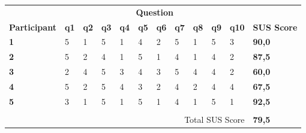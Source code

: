 \begin{table}[]
    \centering
    \begin{tabular}{llllllllllll}
    \rowcolor[HTML]{FFFFFF} 
                         & \multicolumn{10}{c}{\cellcolor[HTML]{FFFFFF}\textbf{Question}}                                                                             & \textbf{}          \\
    \rowcolor[HTML]{FFFFFF} 
    \textbf{Participant} & \textbf{q1} & \textbf{q2} & \textbf{q3} & \textbf{q4} & \textbf{q5} & \textbf{q6} & \textbf{q7} & \textbf{q8} & \textbf{q9} & \textbf{q10} & \textbf{SUS Score} \\
    \rowcolor[HTML]{FFFFFF} 
    \textbf{1}           & 5           & 1           & 5           & 1           & 4           & 2           & 5           & 1           & 5           & 3            & \textbf{90,0}      \\
    \rowcolor[HTML]{FFFFFF} 
    \textbf{2}           & 5           & 2           & 4           & 1           & 5           & 1           & 4           & 1           & 4           & 2            & \textbf{87,5}      \\
    \rowcolor[HTML]{FFFFFF} 
    \textbf{3}           & 2           & 4           & 5           & 3           & 4           & 3           & 5           & 4           & 4           & 2            & \textbf{60,0}      \\
    \rowcolor[HTML]{FFFFFF} 
    \textbf{4}           & 5           & 2           & 5           & 4           & 3           & 2           & 4           & 2           & 4           & 4            & \textbf{67,5}      \\
    \rowcolor[HTML]{FFFFFF} 
    \textbf{5}           & 3           & 1           & 5           & 1           & 5           & 1           & 4           & 1           & 5           & 1            & \textbf{92,5}      \\
    \rowcolor[HTML]{FFFFFF} 
                         & \multicolumn{10}{l}{\cellcolor[HTML]{FFFFFF}}                                                                                              & \textbf{}          \\
    \rowcolor[HTML]{FFFFFF} 
                         & \multicolumn{10}{r}{\cellcolor[HTML]{FFFFFF}Total SUS Score}                                                                               & \textbf{79,5}      \\

\end{tabular}
\end{table}
